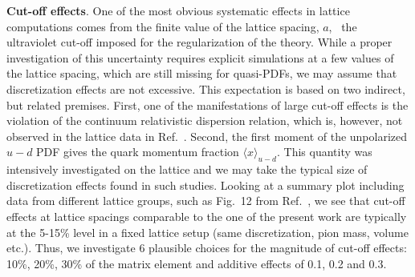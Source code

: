 \textbf{Cut-off effects}. One of the most obvious systematic effects in lattice
computations comes from the finite value of the lattice spacing, $a$, \ie\ the
ultraviolet cut-off imposed for the regularization of the theory. While a proper
investigation of this uncertainty requires explicit simulations at a few values
of the lattice spacing, which are still missing for quasi-PDFs, we may assume
that discretization effects are not excessive. This expectation is based on two
indirect, but related premises. First, one of the manifestations of large
cut-off effects is the violation of the continuum relativistic dispersion
relation, which is, however, not observed in the lattice data in
Ref.~\cite{Alexandrou:2019lfo}. Second, the first moment of the unpolarized
$u-d$ PDF gives the quark momentum fraction $\langle x\rangle_{u-d}$. This
quantity was intensively investigated on the lattice and we may take the typical
size of discretization effects found in such studies. Looking at a summary plot
including data from different lattice groups, such as Fig.\ 12 from Ref.\
\cite{Constantinou:2014tga}, we see that cut-off effects at lattice spacings
comparable to the one of the present work are typically at the 5-15\% level in a
fixed lattice setup (same discretization, pion mass, volume etc.). Thus, we
investigate 6 plausible choices for the magnitude of cut-off effects: 10\%,
20\%, 30\% of the matrix element and additive effects of 0.1, 0.2 and 0.3. 

